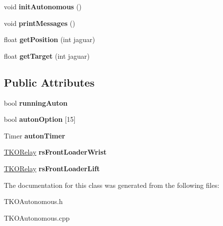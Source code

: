 \begin{DoxyCompactItemize}
\item 
\hypertarget{classTKOAutonomous_a55574f442039f1c8deec69c51fde0cf0}{void {\bfseries init\-Autonomous} ()}\label{classTKOAutonomous_a55574f442039f1c8deec69c51fde0cf0}

\item 
\hypertarget{classTKOAutonomous_a806ccd431bfce0d33e5a82b8e0eaa00c}{void {\bfseries print\-Messages} ()}\label{classTKOAutonomous_a806ccd431bfce0d33e5a82b8e0eaa00c}

\item 
\hypertarget{classTKOAutonomous_ae4c8fd87e95ae6d6c83f61ea76e6b2b9}{float {\bfseries get\-Position} (int jaguar)}\label{classTKOAutonomous_ae4c8fd87e95ae6d6c83f61ea76e6b2b9}

\item 
\hypertarget{classTKOAutonomous_aec46fe3fa684ac8ae2fa35b056df5a7b}{float {\bfseries get\-Target} (int jaguar)}\label{classTKOAutonomous_aec46fe3fa684ac8ae2fa35b056df5a7b}

\end{DoxyCompactItemize}
\subsection*{\-Public \-Attributes}
\begin{DoxyCompactItemize}
\item 
\hypertarget{classTKOAutonomous_a605d48e59d3fd76075ea3bc143311835}{bool {\bfseries running\-Auton}}\label{classTKOAutonomous_a605d48e59d3fd76075ea3bc143311835}

\item 
\hypertarget{classTKOAutonomous_acc6f8a15475ab7daa121a9c7030b478e}{bool {\bfseries auton\-Option} \mbox{[}15\mbox{]}}\label{classTKOAutonomous_acc6f8a15475ab7daa121a9c7030b478e}

\item 
\hypertarget{classTKOAutonomous_ae41b958c3e2bc415c6289a5876de9053}{\-Timer {\bfseries auton\-Timer}}\label{classTKOAutonomous_ae41b958c3e2bc415c6289a5876de9053}

\item 
\hypertarget{classTKOAutonomous_a591946de1844a1b5ca7ff952a73cc6b3}{\hyperlink{classTKORelay}{\-T\-K\-O\-Relay} {\bfseries rs\-Front\-Loader\-Wrist}}\label{classTKOAutonomous_a591946de1844a1b5ca7ff952a73cc6b3}

\item 
\hypertarget{classTKOAutonomous_aa3b1eda6bddcb77236fa9d6d3492b1a1}{\hyperlink{classTKORelay}{\-T\-K\-O\-Relay} {\bfseries rs\-Front\-Loader\-Lift}}\label{classTKOAutonomous_aa3b1eda6bddcb77236fa9d6d3492b1a1}

\end{DoxyCompactItemize}


\-The documentation for this class was generated from the following files\-:\begin{DoxyCompactItemize}
\item 
\-T\-K\-O\-Autonomous.\-h\item 
\-T\-K\-O\-Autonomous.\-cpp\end{DoxyCompactItemize}
